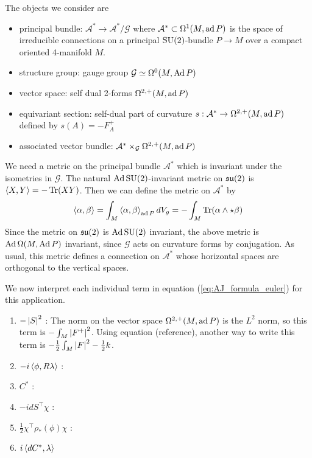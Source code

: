 The objects we consider are 
\begin{itemize}
	\item principal bundle: $\mathcal{A}^* \to \mathcal{A}^* /\mathcal{G}$ where 
	$\mathcal{A}^* \subset \Omega^1(M,\operatorname{ad} P)$ is the
		space of irreducible connections   on a principal $\operatorname{SU}(2)$-bundle  $P\to M$
		over a compact oriented 4-manifold $M$. 
	\item structure group: gauge group $\mathcal{G}\simeq \Omega^0(M,\operatorname{Ad} P)$
	\item vector space: self dual 2-forms $\Omega^{2,+}(M,\operatorname{ad} P)$ 
	\item equivariant section: self-dual part of curvature $s : \mathcal{A}^* \to
		\Omega^{2,+}(M,\operatorname{ad} P)$ defined by $s(A)=-F_A^+$
	\item associated vector bundle: $\mathcal{A}^* \times_\mathcal{G}
		\Omega^{2,+}(M,\operatorname{ad} P)$
\end{itemize}
\begin{comment} %
Donaldson only treats the case $G=\SU(2)$ due to technical reasons relating to 
singularities in the moduli space, however we do not worry about these details. 
Since our objective is to apply the Atiyah-Jeffrey
formula to the infinite dimensional vector space $\Omega^{2,+}(\ad P)$, complete
rigor is out of the question for this application anyway. 
\end{comment}

We need a metric on the principal bundle $\mathcal{A}^*$ which is invariant 
under the isometries in $\mathcal{G}$. The natural $\operatorname{Ad} \operatorname{SU}(2)$-invariant metric 
on $\operatorname{\mathfrak{su}}(2)$ is $\gen{X,Y}=-\Tr(XY)$. 
Then we can define the metric on $\mathcal{A}^*$ by 
\[
	\gen{\alpha,\beta} = \int_M \gen{\alpha,\beta}_{\ad P} dV_g = -\int_M
	\Tr(\alpha \wedge \star \beta)
\] 
Since the metric on $\operatorname{\mathfrak{su}}(2)$ is  $\operatorname{Ad} \operatorname{SU}(2)$ invariant, the above metric is
$\operatorname{Ad}\Omega(M,\operatorname{Ad} P)$ invariant, since $\mathcal{G}$ acts on curvature forms by
conjugation. As usual, this metric defines a connection on $\mathcal{A}^*$ whose
horizontal spaces are orthogonal to the vertical spaces. 


We now interpret each individual term in equation (\ref{eq:AJ_formula_euler})
for this application. 
\begin{enumerate}[(1), leftmargin=\parindent]
    \item 
$-\abs{S}^2$ : The norm on the vector space $\Omega^{2,+}(M,\operatorname{ad} P)$ is the 
$L^2$ norm, so this term is $-\int_M \abs{F^+}^2$. Using equation (reference),
another way to write this term is $-\frac{1}{2}\int_M \abs{F}^2 - \frac{1}{2}k$.

	\item 
$-i\gen{\phi,R\lambda}$ :

	\item 
$C^*$ :


	\item 
$-idS^\intercal \chi$ :

	\item 
$\frac{1}{2}\chi^\intercal \rho_*(\phi)\chi$ :

	\item 
$i\gen{dC^*,\lambda} $
\end{enumerate}


